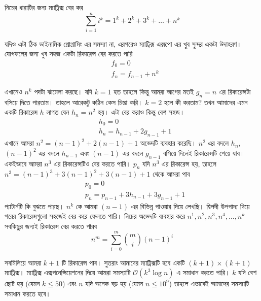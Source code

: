 \begin{problem}
নিচের ধারাটির জন্য ম্যাট্রিক্স বের কর
$$\sum_{i = 1}^n i^{k} = 1^{k} + 2^{k} + 3^{k}+ \dots + n^{k}$$
\end{problem}

\begin{solution}
যদিও এটা ঠিক ডাইনামিক প্রোগ্রামিং এর সমস্যা না, এরপরেও ম্যাট্রিক্স এক্সপো এর খুব সুন্দর একটা উদাহরণ। যোগফলের জন্য খুব সহজ একটা রিকারেন্স বের করতে পারি
\begin{align*}
& f_{0} = 0 \\
& f_{n} = f_{n - 1} + n^k
\end{align*}

এখানেও $n^k$ পদটা ঝামেলা করছে। যদি $k = 1$ হত তাহলে কিন্তু আমরা আগের মতই $g_{n} = n$ এর রিকারেন্সটা বসিয়ে দিতে পারতাম। তাহলে আরেকটু কঠিন কেস চিন্তা করি। $k = 2$ হলে কী করতাম? তখন আমাদের এমন একটি রিকারেন্স $h$ লাগত যেন $h_{n} = n^{2}$ হয়। এটা বের করাও কিন্তু বেশ সহজ।
\begin{align*}
& h_{0} = 0 \\
& h_{n} = h_{n - 1} + 2g_{n - 1} + 1
\end{align*}
এখানে আমরা $n^2 = (n - 1)^2 + 2(n - 1) + 1$ অভেদটি ব্যবহার করেছি। $n^2$ এর বদলে $h_{n}$, $(n - 1)^2$ এর বদলে $h_{n - 1}$ এবং $(n - 1)$ এর বদলে $g_{n - 1}$ বসিয়ে দিলেই রিকারেন্সটি পেয়ে যাব। একইভাবে আমরা $n^3$ এর রিকারেন্সটিও বের করতে পারি। $p_{n}$ যদি $n^3$ এর রিকারেন্স হয়, তাহলে $n^3 = (n - 1)^3 + 3(n - 1)^2 + 3(n - 1) + 1$ থেকে আমরা পাব
\begin{align*}
& p_{0} = 0 \\
& p_{n} = p_{n - 1} + 3h_{n - 1} + 3g_{n - 1} + 1
\end{align*}
প্যাটার্নটি কি বুঝতে পারছ। $n^{k}$ কে আমরা $(n - 1)$ এর বিভিন্ন পাওয়ার দিয়ে লেখছি। দ্বিপদী উপপাদ্য দিয়ে পরের রিকারেন্সগুলো সহজেই বের করে ফেলতে পারি। নিচের অভেদটি ব্যবহার করে $n^1, n^2, n^3, n^4, \dots, n^k$ সবকিছুর জন্যই রিকারেন্স বের করতে পারব
$$n^{m} = \sum_{i = 0}^{m} \binom{m}{i} (n - 1)^i$$

সবমিলিয়ে আমরা $k + 1$ টি রিকারেন্স পাব। সুতরাং আমাদের ম্যাট্রিক্সটি হবে একটি $(k + 1) \times (k + 1)$ ম্যাট্রিক্স। ম্যাট্রিক্স  এক্সপনেন্সিয়েশনের দিয়ে আমরা সমস্যাটি $\mathcal{O}(k^3 \log{n})$ এ সমাধান করতে পারি। $k$ যদি বেশ ছোট হয় (যেমন $k \leq 50$) এবং $n$ যদি অনেক বড় হয় (যেমন $n \leq 10^9$) তাহলে এভাবেই আমাদের সমস্যাটি সমাধান করতে হবে।
\end{solution}

